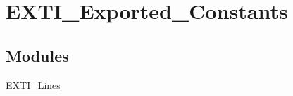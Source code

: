 \hypertarget{group__EXTI__Exported__Constants}{
\section{EXTI\_\-Exported\_\-Constants}
\label{group__EXTI__Exported__Constants}
}
\subsection*{Modules}
\begin{DoxyCompactItemize}
\item 
\hyperlink{group__EXTI__Lines}{EXTI\_\-Lines}
\end{DoxyCompactItemize}
